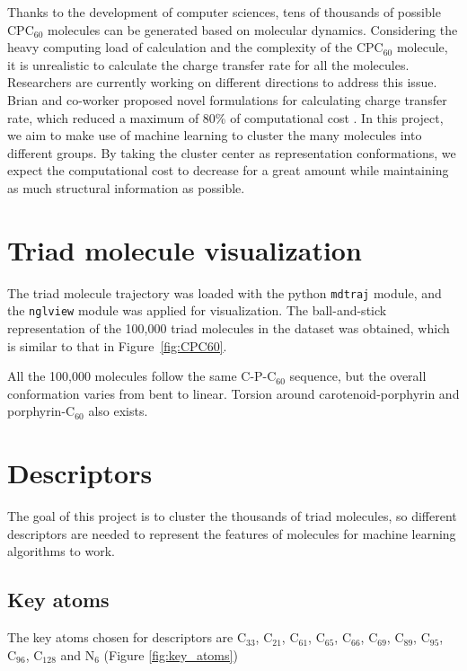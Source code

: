 \documentclass[a4paper]{article}
\begin{document}
Thanks to the development of computer sciences, tens of thousands of possible \(\text{CPC}_{60}\) molecules can be generated based on molecular dynamics. Considering the heavy computing load of calculation and the complexity of the \(\text{CPC}_{60}\) molecule, it is unrealistic to calculate the charge transfer rate for all the molecules. Researchers are currently working on different directions to address this issue. Brian and co-worker proposed novel formulations for calculating charge transfer rate, which reduced a maximum of 80\% of computational cost \cite{BrianDomi}. In this project, we aim to make use of machine learning to cluster the many molecules into different groups. By taking the cluster center as representation conformations, we expect the computational cost to decrease for a great amount while maintaining as much structural information as possible.
\pagebreak

\section{Triad molecule visualization}
The triad molecule trajectory was loaded with the python \texttt{mdtraj} module, and the \texttt{nglview} module was applied for visualization. The ball-and-stick representation of the 100,000 triad molecules in the dataset was obtained, which is similar to that in Figure~\ref{fig:CPC60}. 

All the 100,000 molecules follow the same C-P-\(\text{C}_{60}\) sequence, but the overall conformation varies from bent to linear. Torsion around carotenoid-porphyrin and porphyrin-\(\text{C}_{60}\) also exists.

\section{Descriptors}
The goal of this project is to cluster the thousands of triad molecules, so different descriptors are needed to represent the features of molecules for machine learning algorithms to work. 

\subsection{Key atoms}
The key atoms chosen for descriptors are \(\text{C}_{33}\), \(\text{C}_{21}\), \(\text{C}_{61}\), \(\text{C}_{65}\), \(\text{C}_{66}\), \(\text{C}_{69}\), \(\text{C}_{89}\), \(\text{C}_{95}\), \(\text{C}_{96}\), \(\text{C}_{128}\) and \(\text{N}_{6}\) (Figure \ref{fig:key_atoms})
\end{document}
